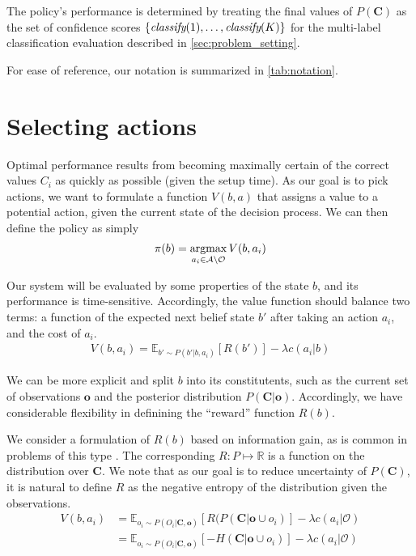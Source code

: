 \documentclass[runningheads]{llncs}
\begin{document}
The policy's performance is determined by treating the final values of $P(\mathbf{C})$ as the set of confidence scores $\{\emph{classify}(1), \dots, \emph{classify}(K)\}$ for the multi-label classification evaluation described in \autoref{sec:problem_setting}.

For ease of reference, our notation is summarized in \autoref{tab:notation}.

\section{Selecting actions} \label{sec:value}
Optimal performance results from becoming maximally certain of the correct values $C_i$ as quickly as possible (given the setup time).
As our goal is to pick actions, we want to formulate a function $V(b,a)$ 	that assigns a value to a potential action, given the current state of the decision process.
We can then define the policy as simply
\begin{align}
\pi(b) = \argmax_{a_i \in \mathcal{A} \setminus \mathcal{O}} V(b,a_i)
\end{align}

Our system will be evaluated by some properties of the state $b$, and its performance is time-sensitive.
Accordingly, the value function should balance two terms: a function of the expected next belief state $b'$ after taking an action $a_i$, and the cost of $a_i$.
\begin{align}
V(b,a_i) = \mathbb{E}_{b' \sim P(b'|b,a_i)}[R(b')] - \lambda c(a_i|b)
\end{align}

We can be more explicit and split $b$ into its constitutents, such as the current set of observations $\mathbf{o}$ and the posterior distribution $P(\mathbf{C}|\mathbf{o})$.
Accordingly, we have considerable flexibility in definining the ``reward'' function $R(b)$.

We consider a formulation of $R(b)$ based on information gain, as is common in problems of this type .
The corresponding $R: P \mapsto \mathbb{R}$ is a function on the distribution over $\mathbf{C}$.
We note that as our goal is to reduce uncertainty of $P(\mathbf{C})$, it is natural to define $R$ as the negative entropy of the distribution given the observations.
\begin{align}
V(b,a_i)
&= \mathbb{E}_{o_i \sim P(O_i|\mathbf{C},\mathbf{o})}[R(P(\mathbf{C}|\mathbf{o} \cup o_i)] - \lambda c(a_i|\mathcal{O}) \\
&= \mathbb{E}_{o_i \sim P(O_i|\mathbf{C},\mathbf{o})}[-H(\mathbf{C}|\mathbf{o} \cup o_i)] - \lambda c(a_i|\mathcal{O})
\end{align}
\end{document}
